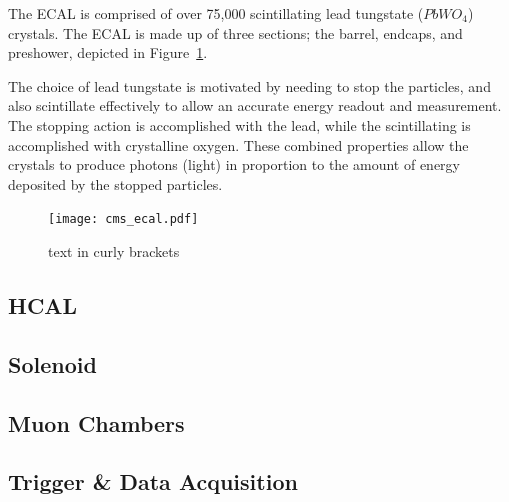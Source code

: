 The ECAL is comprised of over 75,000 scintillating lead tungstate ($PbWO_{4}$) crystals. The ECAL is made up of
three sections; the barrel, endcaps, and preshower, depicted in Figure~\ref{fig:cms_ecal}.

The choice of lead tungstate is motivated by needing to stop the particles, and
also scintillate effectively to allow an accurate energy readout and measurement. The stopping action is accomplished with the lead, while the scintillating is accomplished with
crystalline oxygen. These combined properties allow the crystals to produce photons (light) in proportion to the amount of energy deposited by the stopped particles.

\begin{figure}[hbtp]
 \begin{center}
   \texttt{[image: cms\_ecal.pdf]}
   \caption[text in square brackets]{text in curly brackets}
   \label{fig:cms_ecal}
 \end{center}
\end{figure}


\subsection{HCAL}

\subsection{Solenoid}

\subsection{Muon Chambers}

\subsection{Trigger & Data Acquisition}


%
% 
% 
